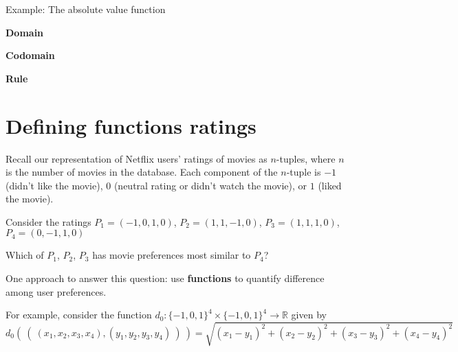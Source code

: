 \documentclass[12pt, oneside]{article}
\begin{document}

\vfill
\newpage

Example: The absolute value function 

{\bf Domain}

{\bf Codomain}

{\bf Rule}

\vfill 
 \vfill
\section*{Defining functions ratings}


Recall our representation of Netflix users' ratings of movies as $n$-tuples, where
$n$ is the number of movies in the database. 
Each component of the $n$-tuple is $-1$ (didn't like the movie), $0$ 
(neutral rating or didn't watch the movie), or $1$ (liked the movie).

Consider the ratings $P_1 = (-1, 0, 1, 0)$, $P_2 = (1, 1, -1, 0)$, $P_3 = (1, 1, 1, 0)$,
$P_4 = (0,-1,1, 0)$


Which of $P_1$, $P_2$, $P_3$ has movie preferences most similar to $P_4$?

One approach to answer this question: use {\bf functions} to quantify difference among user preferences.

For example, consider the function 
$d_0: \{-1,0,1\}^4 \times \{-1,0,1\}^4 \to \mathbb{R}$
given by
\[
d_0 (~(~ (x_1, x_2, x_3, x_4), (y_1, y_2, y_3, y_4) ~) ~) = \sqrt{ (x_1 - y_1)^2 + (x_2 - y_2)^2 + (x_3 -y_3)^2 + (x_4 -y_4)^2}
\]
\end{document}
